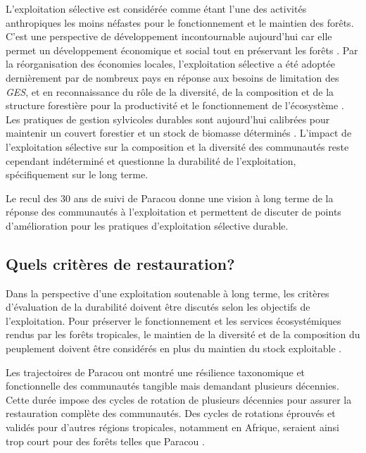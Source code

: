 \documentclass[
  11pt,
  french,
  A4paper,
  extrafontsizes,onecolumn,openright
  ]{memoir}
\begin{document}
L'exploitation sélective est considérée comme étant l'une des activités
anthropiques les moins néfastes pour le fonctionnement et le maintien
des forêts. C'est une perspective de développement incontournable
aujourd'hui car elle permet un développement économique et social tout
en préservant les forêts \autocite{Chaudhary2016}. Par la réorganisation
des économies locales, l'exploitation sélective a été adoptée
dernièrement par de nombreux pays en réponse aux besoins de limitation
des \emph{GES}, et en reconnaissance du rôle de la diversité, de la
composition et de la structure forestière pour la productivité et le
fonctionnement de l'écosystème \autocite{Begon2006}. Les pratiques de
gestion sylvicoles durables sont aujourd'hui calibrées pour maintenir un
couvert forestier et un stock de biomasse déterminés
\autocite{ITTO2005}. L'impact de l'exploitation sélective sur la
composition et la diversité des communautés reste cependant indéterminé
et questionne la durabilité de l'exploitation, spécifiquement sur le
long terme.

Le recul des 30 ans de suivi de Paracou donne une vision à long terme de
la réponse des communautés à l'exploitation et permettent de discuter de
points d'amélioration pour les pratiques d'exploitation sélective
durable.

\subsection{Quels critères de
restauration?}\label{quels-criteres-de-restauration}

Dans la perspective d'une exploitation soutenable à long terme, les
critères d'évaluation de la durabilité doivent être discutés selon les
objectifs de l'exploitation. Pour préserver le fonctionnement et les
services écosystémiques rendus par les forêts tropicales, le maintien de
la diversité et de la composition du peuplement doivent être considérés
en plus du maintien du stock exploitable
\autocites{ITTO2005}{Barlow2018}.

Les trajectoires de Paracou ont montré une résilience taxonomique et
fonctionnelle des communautés tangible mais demandant plusieurs
décennies. Cette durée impose des cycles de rotation de plusieurs
décennies pour assurer la restauration complète des communautés. Des
cycles de rotations éprouvés et validés pour d'autres régions
tropicales, notamment en Afrique, seraient ainsi trop court pour des
forêts telles que Paracou \autocite{Durrieu1998}.
\end{document}

